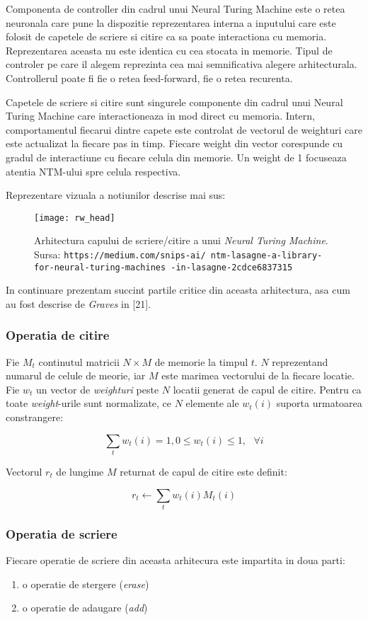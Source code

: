 \documentclass[12pt]{article}
\begin{document}
Componenta de controller din cadrul unui Neural Turing Machine este o retea neuronala care pune la dispozitie reprezentarea interna a inputului care este folosit de capetele de scriere si citire ca sa poate interactiona cu memoria. Reprezentarea aceasta nu este identica cu cea stocata in memorie. Tipul de controler pe care il alegem reprezinta cea mai semnificativa alegere arhitecturala. Controllerul poate fi fie o retea feed-forward, fie o retea recurenta.

Capetele de scriere si citire sunt singurele componente din cadrul unui Neural Turing Machine care interactioneaza in mod direct cu memoria. Intern, comportamentul fiecarui dintre capete este controlat de vectorul de weighturi care este actualizat la fiecare pas in timp. Fiecare weight din vector corespunde cu gradul de interactiune cu fiecare celula din memorie. Un weight de 1 focuseaza atentia NTM-ului spre celula respectiva.

Reprezentare vizuala a notiunilor descrise mai sus:

\begin{figure}
\centering
\texttt{[image: rw\_head]}
\\
\caption{Arhitectura capului de scriere/citire a unui \textit{Neural Turing Machine}. Sursa: \texttt{https://medium.com/snips-ai/
ntm-lasagne-a-library-for-neural-turing-machines
-in-lasagne-2cdce6837315}}
\end{figure}

In continuare prezentam succint partile critice din aceasta arhitectura, asa cum au fost descrise de \textit{Graves} in [21].

\subsubsection{Operatia de citire}
Fie $M_t$ continutul matricii $N \times M$ de memorie la timpul $t$. $N$ reprezentand numarul de celule de meorie, iar $M$ este marimea vectorului de la fiecare locatie. Fie $w_t$ un vector de \textit{weighturi} peste $N$ locatii generat de capul de citire. Pentru ca toate \textit{weight}-urile sunt normalizate, ce $N$ elemente ale $w_t(i)$ suporta urmatoarea constrangere:

$$\sum_t w_t(i)= 1, 0 \leq w_t(i) \leq 1,\ \ \ \forall i $$

Vectorul $r_t$ de lungime $M$ returnat de capul de citire este definit:

$$r_t \leftarrow \sum_{t} w_t(i)M_t(i) $$
\subsubsection{Operatia de scriere}
Fiecare operatie de scriere din aceasta arhitecura este impartita in doua parti:
\begin{enumerate}
	\item o operatie de stergere (\textit{erase})
	\item o operatie de adaugare (\textit{add})
\end{enumerate}
\end{document}
